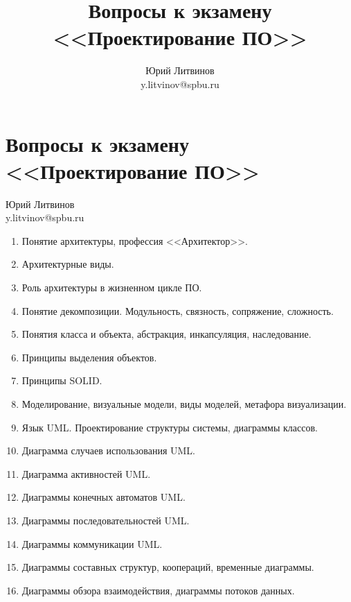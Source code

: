 \documentclass[a5paper]{article}
\title{Вопросы к экзамену <<Проектирование ПО>>}
\author{Юрий Литвинов\\\small{y.litvinov@spbu.ru}}
\begin{document}
\thispagestyle{empty}

\section*{Вопросы к экзамену <<Проектирование ПО>>}

\begin{flushright}\begin{small}Юрий Литвинов\\\small{y.litvinov@spbu.ru}\end{small}\end{flushright}

\begin{enumerate}
    \item Понятие архитектуры, профессия <<Архитектор>>.
    \item Архитектурные виды.
    \item Роль архитектуры в жизненном цикле ПО.
    \item Понятие декомпозиции. Модульность, связность, сопряжение, сложность.
    \item Понятия класса и объекта, абстракция, инкапсуляция, наследование. 
    \item Принципы выделения объектов.
    \item Принципы SOLID.
    \item Моделирование, визуальные модели, виды моделей, метафора визуализации.
    \item Язык UML. Проектирование структуры системы, диаграммы классов.
    \item Диаграмма случаев использования UML.
    \item Диаграмма активностей UML.
    \item Диаграммы конечных автоматов UML.
    \item Диаграммы последовательностей UML.
    \item Диаграммы коммуникации UML.
    \item Диаграммы составных структур, коопераций, временные диаграммы.
    \item Диаграммы обзора взаимодействия, диаграммы потоков данных.

\end{enumerate}
\end{document}
